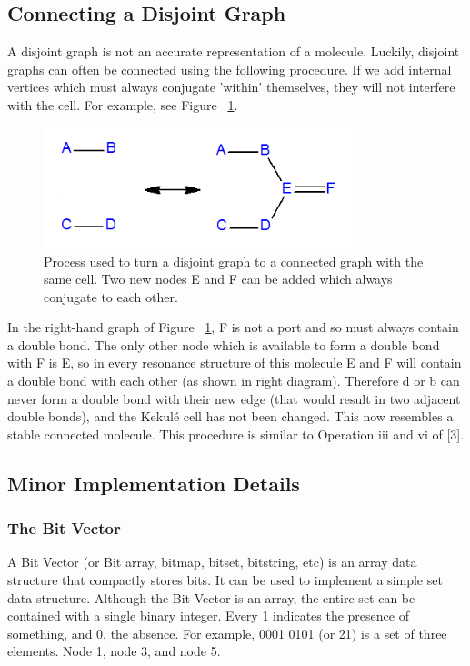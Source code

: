 \documentclass[12pt]{article}
\begin{document}
\subsection{Connecting a Disjoint Graph}
A disjoint graph is not an accurate representation of a molecule. Luckily, disjoint graphs can often be connected using the following procedure. If we add internal vertices which must always conjugate ’within’ themselves, they will not interfere with the cell. For example, see Figure ~\ref{fig:disjoint}.

\begin{figure}[ht!]
\centering
\includegraphics[width=90mm]{disjoint2.png}
\caption{Process used to turn a disjoint graph to a connected graph with the same cell. Two new nodes E and F can be added which always conjugate to each other.}
\label{fig:disjoint}
\end{figure}

In the right-hand graph of Figure ~\ref{fig:disjoint}, F is not a port and so must always contain a double bond. The only other node which is available to form a double bond with F is E, so in every resonance structure of this molecule E and F will contain a double bond with each other (as shown in right diagram). Therefore d or b can never form a double bond with their new edge (that would result in two adjacent double bonds), and the Kekul\'e cell has not been changed. This now resembles a stable connected molecule. This procedure is similar to Operation iii and vi of [3].

\subsection{Minor Implementation Details} 

\subsubsection{The Bit Vector}

A Bit Vector (or Bit array, bitmap, bitset, bitstring, etc) is an array data structure that compactly stores bits. It can be used to implement a simple set data structure. Although the Bit Vector is an array, the entire set can be contained with a single binary integer. Every 1 indicates the presence of something, and 0, the absence. For example, 0001 0101 (or 21) is a set of three elements. Node 1, node 3, and node 5. 
\end{document}
